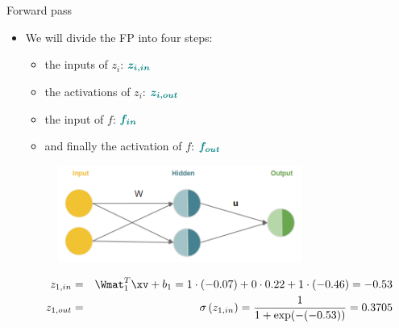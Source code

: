 \begin{vbframe}{ Forward pass}

\begin{itemize}
\item We will divide the FP into four steps:
\begin{itemize}
\item the inputs of $z_i$: $\bm{\textcolor{teal}{z_{i,in}}}$
\item the activations of $z_i$: $\bm{\textcolor{teal}{z_{i,out}}}$
\item the input of $f$: $\bm{\textcolor{teal}{f_{in}}}$
\item and finally the activation of $f$: $\bm{\textcolor{teal}{f_{out}}}$
\end{itemize}
\begin{figure}
\centering
\includegraphics[width=8cm]{figure/xor_rep.png}
\end{figure}
\begin{figure}
\centering
{}
\end{figure}
\begin{footnotesize}
\begin{eqnarray*}
z_{1,in} &=& \Wmat_1^T \xv + b_1 =  1 \cdot (-0.07) + 0 \cdot 0.22 + 1 \cdot (-0.46) = -0.53 \\
z_{1,out} &=& \sigma\left(z_{1,in}\right) = \frac{1}{1+\exp(-(-0.53))} = \num[round-mode=places,round-precision=4]{0.3705169}
\end{eqnarray*}
\end{footnotesize}
\end{itemize}
\framebreak


\end{vbframe}
